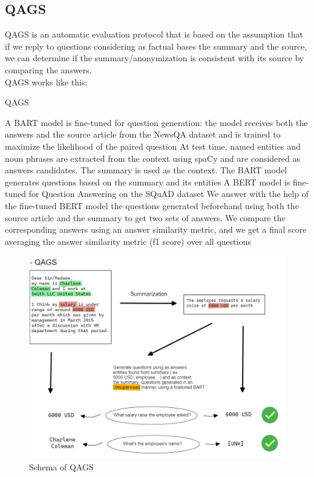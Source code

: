 \subsection{QAGS}
QAGS is an automatic evaluation protocol that is based on the assumption that if we reply to questions considering as factual bases the summary and the source, we can determine if the summary/anonymization is consistent with its source by comparing the answers. \\
QAGS works like this:
\begin{algorithm}[h]
    \caption*{QAGS}
    \begin{algorithmic}[1]
      \State A BART\cite{lewis2019bart} model is fine-tuned for question generation: the model receives both the answers and the source article from the NewsQA dataset and is trained to maximize the likelihood of the paired question
      \State At test time, named entities and noun phrases are extracted from the context using spaCy and are considered as answers candidates. The summary is used as the context.
      \State The BART model generates questions based on the summary and its entities
      \State A BERT model is fine-tuned for Question Answering on the SQuAD dataset
      \State We answer with the help of the fine-tuned BERT model the questions generated beforehand using both the source article and the summary to get two sets of answers. 
      \State We compare the corresponding answers using an answer similarity metric, and we get a final score averaging the answer similarity metric (f1 score) over all questions
    \end{algorithmic}
\end{algorithm}
\begin{figure}[h] 
    \includegraphics[width=\textwidth]{images/qa_models_qags.png}
    \caption{Schema of QAGS}
    \label{fig:schema_qags}
\end{figure}    
\newpage

